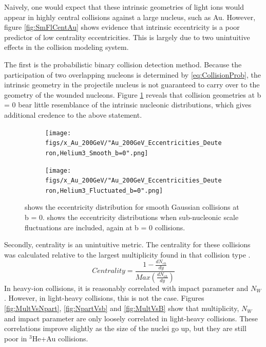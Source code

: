 \documentclass[preprint,showpacs,amsfonts,aps,prl,nofootinbib,floatfix]{revtex4}
\begin{document}
Naively, one would expect that these intrinsic geometries of light ions would appear in highly central collisions against a large nucleus, such as Au. However, figure \ref{fig:SmFlCentAu} shows evidence that intrinsic eccentricity is a poor predictor of low centrality eccentricities. This is largely due to two unintuitive effects in the collision modeling system. 

The first is the probabilistic binary collision detection method. Because the participation of two overlapping nucleons is determined by \ref{eq:CollisionProb}, the intrinsic geometry in the projectile nucleus is not guaranteed to carry over to the geometry of the wounded nucleons. Figure \ref{fig:SmFlAub=0} reveals that collision geometries at b = 0 bear little resemblance of the intrinsic nucleonic distributions, which gives additional credence to the above statement.

\begin{figure}
	\begin{center}
		\begin{subfigure}[t]{0.4\linewidth}
			\texttt{[image: figs/x\_Au\_200GeV/"Au\_200GeV\_Eccentricities\_Deuteron,Helium3\_Smooth\_b=0".png]}
			\subcaption{\label{subfig:SmAub=0}}
		\end{subfigure}
		\begin{subfigure}[t]{0.4\linewidth}
			\texttt{[image: figs/x\_Au\_200GeV/"Au\_200GeV\_Eccentricities\_Deuteron,Helium3\_Fluctuated\_b=0".png]}
			\subcaption{\label{subfig:FlAub=0}}
		\end{subfigure}
		\caption{ shows the eccentricity distribution for smooth Gaussian collisions at b = 0.  shows the eccentricity distributions when sub-nucleonic scale fluctuations are included, again at b = 0 collisions. }
		\label{fig:SmFlAub=0}
	\end{center}
\end{figure} 

Secondly, centrality is an unintuitive metric. The centrality for these collisions was calculated relative to the largest multiplicity found in that collision type \cite{Shen:2014vra}.
\begin{equation}
Centrality = \frac{1-\frac{dN_{ch}}{dy}}{Max(\frac{dN_{ch}}{dy})} 
\end{equation}
In heavy-ion collisions, it is reasonably correlated with impact parameter and $N_W$. However, in light-heavy collisions, this is not the case. Figures \ref{fig:MultVsNpart}, \ref{fig:NpartVsb} and \ref{fig:MultVsB} show that multiplicity, $N_W$ and impact parameter are only loosely correlated in light-heavy collisions. These correlations improve slightly as the size of the nuclei go up, but they are still poor in $^3$He+Au collisions.
\end{document}
